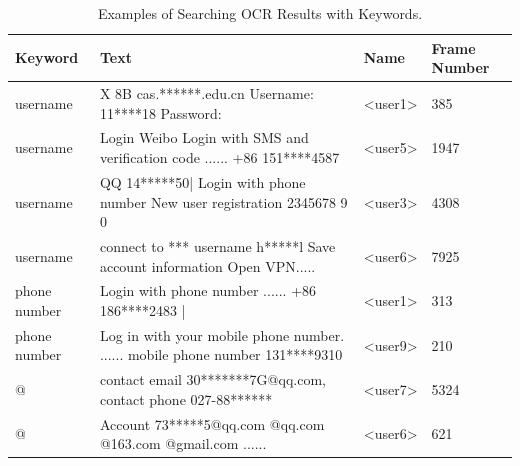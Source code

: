 \begin{table}[t]
	\centering
	\begin{tabular}{|l|l|l|l|}
		\hline
		\textbf{Keyword} & \textbf{Text}                                                             & \textbf{Name}                                   & \textbf{Frame Number} \\ \hline
		username                          & X 8B cas.******.edu.cn Username: 11****18 Password:                                        & \textless{}user1\textgreater{} & 385                                    \\ \hline
		username                          & Login Weibo Login with SMS and verification code ...... +86 151****4587                    & \textless{}user5\textgreater{} & 1947                                   \\ \hline
		username                          & QQ 14*****50| Login with phone number New user registration 2345678 9 0                    & \textless{}user3\textgreater{} & 4308                                   \\ \hline
		username                          & connect to *** username h*****l Save account information Open VPN.....                     & \textless{}user6\textgreater{} & 7925                                   \\ \hline
		phone number                      & Login with phone number ...... +86 186****2483 |                                           & \textless{}user1\textgreater{} & 313                                    \\ \hline
		phone number                      & Log in with your mobile phone number. ...... mobile phone number 131****9310 & \textless{}user9\textgreater{} & 210                                    \\ \hline
		@                                 & contact email 30*******7G@qq.com, contact phone 027-88******                               & \textless{}user7\textgreater{} & 5324                                   \\ \hline
		@                                 & Account 73*****5@qq.com @qq.com @163.com @gmail.com 	......      & \textless{}user6\textgreater{} & 621                                    \\ \hline
	\end{tabular}
	\linebreak
	\caption{Examples of Searching \ac{OCR} Results with Keywords.}
	\label{tab:ocr_keyword_example}
\end{table}

